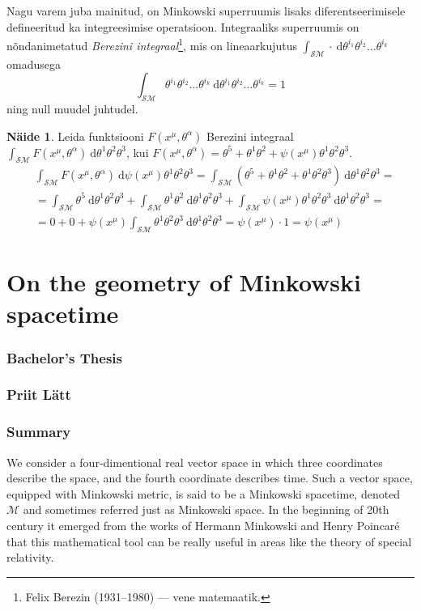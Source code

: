 \documentclass[12pt,a4paper,oneside]{article}
\theoremstyle{plain}
\theoremstyle{definition}
\newtheorem{naide}{Näide}[section]
\numberwithin{equation}{section}
\def\M{{\mathcal M}}
\def\SM{{\mathcal {SM}}}
\def\engtitle{On the geometry of Minkowski spacetime}
\def\author{Priit Lätt}
\begin{document}
Nagu varem juba mainitud, on Minkowski superruumis lisaks 
diferentseerimisele defineeritud ka integreesimise operatsioon. 
Integraaliks superruumis on nõnda\-nimetatud \emph{Berezini 
integraal}\footnote{Felix Berezin (1931--1980) --- vene 
matemaatik.}, mis on lineaarkujutus $\int_{\SM} 
\cdot \ \mathrm{d} \theta^{i_1} \theta^{i_2} \ldots \theta^{i_k}$ 
omadusega
\[\int_{\SM} \theta^{i_1} \theta^{i_2} 
	\ldots \theta^{i_k} \ 
	\mathrm{d} \theta^{i_1} \theta^{i_2} \ldots \theta^{i_k} = 1\]
ning null muudel juhtudel.

\begin{naide}
Leida funktsiooni $F\left(x^{\mu}, \theta^{\alpha}\right)$ 
Berezini integraal $\int_{\SM} F\left(x^{\mu}, 
\theta^{\alpha}\right) \ \mathrm{d} \theta^1 \theta^2 
\theta^3$, kui $F\left(x^{\mu}, \theta^{\alpha}\right) = 
	\theta^5 + \theta^1 \theta^2 + 
	\psi\left(x^{\mu}\right) \theta^1 \theta^2 \theta^3$.
\begin{align*}
&\int_{\SM} F\left(x^{\mu}, 
	\theta^{\alpha}\right) \ \mathrm{d} 
	\psi\left(x^{\mu}\right) \theta^1 \theta^2 \theta^3 = 
\int_{\SM} \left(\theta^5 + \theta^1 \theta^2 + 
	\theta^1 \theta^2 \theta^3\right) \ 
	\mathrm{d} \theta^1 \theta^2 \theta^3 = \\
&= \int_{\SM} \theta^5 \ \mathrm{d} \theta^1 \theta^2 \theta^3 +
\int_{\SM} \theta^1 \theta^2 \ 
	\mathrm{d} \theta^1 \theta^2 \theta^3 + 
\int_{\SM} \psi\left(x^{\mu}\right) 
	\theta^1 \theta^2 \theta^3 \ 
	\mathrm{d} \theta^1 \theta^2 \theta^3 = \\
&= 0 + 0 + \psi\left(x^{\mu}\right) 
	\int_{\SM} \theta^1 \theta^2 \theta^3 \ 
	\mathrm{d} \theta^1 \theta^2 \theta^3= 
	\psi\left(x^{\mu}\right) \cdot 1 = \psi\left(x^{\mu}\right)
\end{align*}
\end{naide}

\newpage
\selectlanguage{english}
\section*{\engtitle}

\subsubsection*{Bachelor's Thesis}
\subsubsection*{\author}
\subsubsection*{Summary}
We consider a four-dimentional real vector space in which 
three coordinates describe the space, and the fourth coordinate 
describes time. Such a vector space, equipped with Minkowski 
metric, is said to be a Minkowski spacetime, denoted $\M$ and 
sometimes referred just as Minkowski space. In the beginning 
of 20th century it emerged from the works of Hermann Minkowski 
and Henry Poincar\'e that this mathematical tool can be 
really useful in areas like the theory of special relativity.
\end{document}
